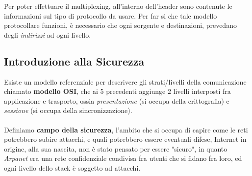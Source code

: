 \documentclass[12pt, letterpaper]{article}
\newcommand{\acc}{\\\hphantom{}\\}
\begin{document}
Per poter effettuare il multiplexing, all'interno dell'header sono contenute le informazioni sul tipo di 
protocollo da usare. Per far si che tale modello protocollare funzioni, è necessario che ogni sorgente e 
destinazioni, prevedano degli \textit{indirizzi} ad ogni livello.
\subsection{Introduzione alla Sicurezza}
Esiste un modello referenziale per descrivere gli strati/livelli della comunicazione chiamato 
\textbf{modello OSI}, che ai 5 precedenti aggiunge 2 livelli interposti fra applicazione e trasporto, ossia 
\textit{presentazione} (si occupa della crittografia) e \textit{sessione} (si occupa della 
sincronizzazione). \acc Definiamo \textbf{campo della sicurezza}, l'ambito che si occupa di capire come le reti 
potrebbero subire attacchi, e quali potrebbero essere eventuali difese, Internet in origine, alla sua nascita, 
non è stato pensato per essere "sicuro", in quanto \textit{Arpanet} era una rete confidenziale condivisa
fra utenti che si fidano fra loro, ed ogni livello dello stack è soggetto ad attacchi.
\end{document}
